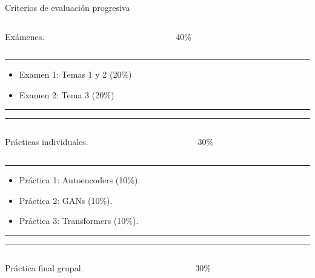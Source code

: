 \begin{frame}{Criterios de evaluación progresiva}
\begin{columns}[T]
\begin{column}{.49\textwidth}
Exámenes.
\end{column}
\hfill
\begin{column}{.49\textwidth}
\centering
\alert{\Huge 40\%}
\end{column}
\end{columns}
\vfill
\hrule

\begin{itemize}
    \item Examen 1: Temas 1 y 2 (\alert{20\%})
    \item Examen 2: Tema 3 (\alert{20\%})
\end{itemize}
\vfill
\hrule
\hrule

\vfill
\begin{columns}[T]
\begin{column}{.49\textwidth}
\vspace{0.2cm}
Prácticas individuales.
\end{column}
\hfill
\begin{column}{.49\textwidth}
\centering
\alert{\Huge 30\%}
\end{column}
\end{columns}
\vfill
\hrule

\begin{itemize}
    \item Práctica 1: Autoencoders (\alert{10\%}).
    \item Práctica 2: GANs (\alert{10\%}).
    \item Práctica 3: Transformers (\alert{10\%}).
\end{itemize}
\vfill

\hrule
\hrule

\vfill
\begin{columns}[T]
\begin{column}{.49\textwidth}
\vspace{0.2cm}
Práctica final grupal.
\end{column}
\begin{column}{.49\textwidth}
\centering
\alert{\Huge 30\%}
\end{column}
\end{columns}
\end{frame}

